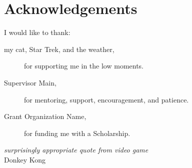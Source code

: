 \newpage
{}

\section*{\Huge Acknowledgements}
\noindent I would like to thank:
\begin{description}
\item[my cat, Star Trek, and the weather,]
	for supporting me in the low moments.
\item[Supervisor Main,]
	for  mentoring, support, encouragement, and patience.
\item[Grant Organization Name,]
	for funding me with a Scholarship.
\end{description}

\begin{flushright}
\textit{surprisingly appropriate quote from video game}
\\
Donkey Kong \\
\end{flushright}
